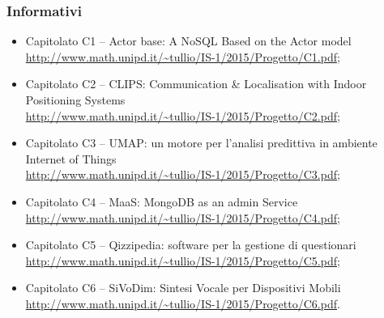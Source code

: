 \subsubsection{Informativi}
\begin{itemize}
\item Capitolato C1 – Actor base: A NoSQL Based on the Actor model\\
\url{http://www.math.unipd.it/~tullio/IS-1/2015/Progetto/C1.pdf};
\item Capitolato C2 – CLIPS: Communication \& Localisation with Indoor Positioning Systems \\ \url{http://www.math.unipd.it/~tullio/IS-1/2015/Progetto/C2.pdf};
\item Capitolato C3 – UMAP: un motore per l'analisi predittiva in ambiente Internet of Things\\ \url{http://www.math.unipd.it/~tullio/IS-1/2015/Progetto/C3.pdf};
\item Capitolato C4 – MaaS: MongoDB as an admin Service\\ 
\url{http://www.math.unipd.it/~tullio/IS-1/2015/Progetto/C4.pdf};
\item Capitolato C5 – Qizzipedia: software per la gestione di questionari\\
\url{http://www.math.unipd.it/~tullio/IS-1/2015/Progetto/C5.pdf};
\item Capitolato C6 – SiVoDim: Sintesi Vocale per Dispositivi Mobili\\ 
\url{http://www.math.unipd.it/~tullio/IS-1/2015/Progetto/C6.pdf}.

\end{itemize}


